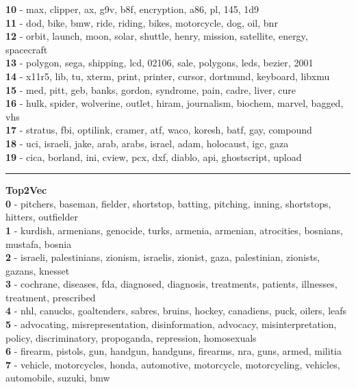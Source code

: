 \textbf{10} - max, clipper, ax, g9v, b8f, encryption, a86, pl, 145, 1d9\\
\textbf{11} - dod, bike, bmw, ride, riding, bikes, motorcycle, dog, oil, bnr\\
\textbf{12} - orbit, launch, moon, solar, shuttle, henry, mission, satellite, energy, spacecraft\\
\textbf{13} - polygon, sega, shipping, lcd, 02106, sale, polygons, leds, bezier, 2001\\
\textbf{14} - x11r5, lib, tu, xterm, print, printer, cursor, dortmund, keyboard, libxmu\\
\textbf{15} - med, pitt, geb, banks, gordon, syndrome, pain, cadre, liver, cure\\
\textbf{16} - hulk, spider, wolverine, outlet, hiram, journalism, biochem, marvel, bagged, vhs\\
\textbf{17} - stratus, fbi, optilink, cramer, atf, waco, koresh, batf, gay, compound\\
\textbf{18} - uci, israeli, jake, arab, arabs, israel, adam, holocaust, igc, gaza\\
\textbf{19} - cica, borland, ini, cview, pcx, dxf, diablo, api, ghostscript, upload\\
\hrule\vspace{2mm}
\noindent
\textbf{Top2Vec}\vspace{2mm}\\
\vspace{2mm}
\noindent
\textbf{0} - pitchers, baseman, fielder, shortstop, batting, pitching, inning, shortstops, hitters, outfielder\\
\textbf{1} - kurdish, armenians, genocide, turks, armenia, armenian, atrocities, bosnians, mustafa, bosnia\\
\textbf{2} - israeli, palestinians, zionism, israelis, zionist, gaza, palestinian, zionists, gazans, knesset\\
\textbf{3} - cochrane, diseases, fda, diagnosed, diagnosis, treatments, patients, illnesses, treatment, prescribed\\
\textbf{4} - nhl, canucks, goaltenders, sabres, bruins, hockey, canadiens, puck, oilers, leafs\\
\textbf{5} - advocating, misrepresentation, disinformation, advocacy, misinterpretation, policy, discriminatory, propoganda, repression, homosexuals\\
\textbf{6} - firearm, pistols, gun, handgun, handguns, firearms, nra, guns, armed, militia\\
\textbf{7} - vehicle, motorcycles, honda, automotive, motorcycle, motorcycling, vehicles, automobile, suzuki, bmw\\
